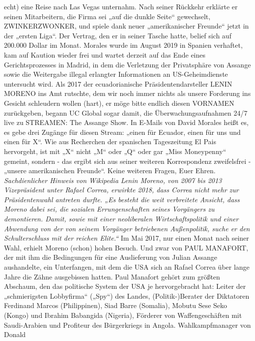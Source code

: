 \begin{multicols}{2}
{echt) eine Reise nach Las Vegas unternahm. Nach seiner
Rückkehr erklärte er seinen Mitarbeitern, die Firma sei
„auf die dunkle Seite“ gewechselt, ZWINKERZWONKER,
und spiele dank neuer „amerikanischer Freunde“ jetzt
in der „ersten Liga“. Der Vertrag, den er in seiner Tasche
hatte, belief sich auf 200.000 Dollar im Monat. Morales
wurde im August 2019 in Spanien verhaftet, kam auf
Kaution wieder frei und wartet derzeit auf das Ende eines Gerichtsprozesses in Madrid, in dem die Verletzung
der Privatsphäre von Assange sowie die Weitergabe illegal erlangter Informationen an US-Geheimdienste untersucht wird.\textCR
Als 2017 der ecuadorianische Präsidentendarsteller LENIN MORENO ins Amt rutschte, dem wir noch immer
nichts als unsere Forderung ins Gesicht schleudern wollen (hart), er möge bitte endlich diesen VORNAMEN
zurückgeben, begann UC Global sogar damit, die Überwachungsaufnahmen 24/7 live zu STREAMEN: The Assange Show. In E-Mails von David Morales heißt es, es
gebe drei Zugänge für diesen Stream: „einen für Ecuador, einen für uns und einen für X“. Wie aus Recherchen
der spanischen Tageszeitung El Pais hervorgeht, ist mit
„X“ nicht „M“ oder „Q“ oder gar „Miss Moneypenny“
gemeint, sondern - das ergibt sich aus seiner weiteren
Korrespondenz zweifelsfrei - „unsere amerikanischen
Freunde“. Keine weiteren Fragen, Euer Ehren.\textCR
\textit{Sachdienlicher Hinweis von Wikipedia \linebreak
Lenin Moreno, von 2007 bis 2013 Vizepräsident unter Rafael Correa, erwirkte 2018, dass Correa nicht mehr zur
Präsidentenwahl antreten durfte. „Es besteht die weit verbreitete Ansicht, dass Moreno dabei sei, die sozialen Errungenschaften seines Vorgängers zu demontieren. Damit, sowie mit einer neoliberalen Wirtschaftspolitik und
einer Abwendung von der von seinem Vorgänger betriebenen Außenpolitik, suche er den Schulterschluss mit der
reichen Elite.“}
Im Mai 2017, nur einen Monat nach seiner Wahl, erhielt
Moreno (schon) hohen Besuch. Und zwar von PAUL MANAFORT, der mit ihm die Bedingungen für eine Auslieferung von Julian Assange aushandelte, ein Unterfangen,
mit dem die USA sich an Rafael Correa über lange Jahre
die Zähne ausgebissen hatten.\textCR
Paul Manafort gehört zum größten Abschaum, den das
politische System der USA je hervorgebracht hat: Leiter der „schmierigsten Lobbyfirma“ („Spy“) des Landes, (Politik-)Berater der Diktatoren Ferdinand Marcos
(Philippinen), Siad Barre (Somalia), Mobutu Sese Seko
(Kongo) und Ibrahim Babangida (Nigeria), Förderer von
Waffengeschäften mit Saudi-Arabien und Profiteur des
Bürgerkriegs in Angola. Wahlkampfmanager von Donald
}
\end{multicols}
